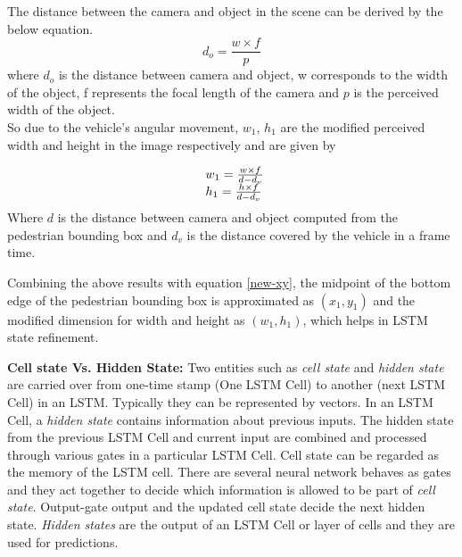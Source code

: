


The distance between the camera and object in the scene can be derived by the below equation.
\begin{equation}
d_o = \frac{w \times f}{p}
\end{equation}
where $d_o$ is the distance between camera and object, w corresponds to the width of the object, f represents the focal length of the camera and $p$ is the perceived width of the object. \\

So due to the vehicle's angular movement, ${w_1}$, ${h_1}$ are the modified perceived width and height in the image respectively and are given by

\begin{equation}
\begin{array}{l@{}} 
{w_1} = \frac{w \times f}{d-d_v} \\
{h_1} = \frac{h \times f}{d-d_v}
\end{array}
\end{equation}
Where $d$ is the distance between camera and object computed from the pedestrian bounding box and $d_v$ is the distance covered by the vehicle in a frame time.

Combining the above results with equation \ref{new-xy}, the midpoint of the bottom edge of the pedestrian bounding box is approximated as $({x_1}, {y_1})$ and the modified dimension for width and height as $({w_1}, {h_1})$, which helps in LSTM state refinement.


\textbf{Cell state Vs. Hidden State:}
Two entities such as \textit{cell state} and \textit{hidden state} are carried over from one-time stamp (One LSTM Cell) to another (next LSTM Cell) in an LSTM. Typically they can be represented by vectors. In an LSTM Cell, a \textit{hidden state }contains information about previous inputs. The hidden state from the previous LSTM Cell and current input are combined and processed through various gates in a particular LSTM Cell. Cell state can be regarded as the memory of the LSTM cell. There are several neural network behaves as gates and they act together to decide which information is allowed to be part of \textit{cell state}. Output-gate output and the updated cell state decide the next hidden state. \textit{Hidden states} are the output of an LSTM Cell or layer of cells and they are used for predictions.  

